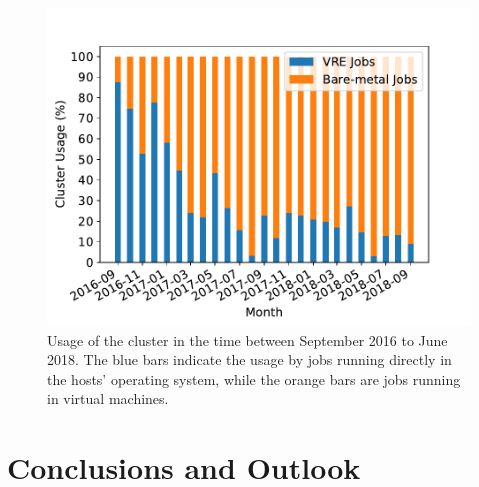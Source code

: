 \begin{figure}
\begin{center}
  \includegraphics[width=\linewidth]{figures/NodeUsage_2016-09_2018-09.pdf}
  \caption{Usage of the \NEMO cluster in the time between September 2016
    to June 2018. The blue bars indicate the usage by jobs
    running directly in the hosts' operating system, while the orange bars are jobs
    running in virtual machines.}
  \label{fig-nodeusage}
\end{center}
\end{figure}

\section{Conclusions and Outlook}


%
















